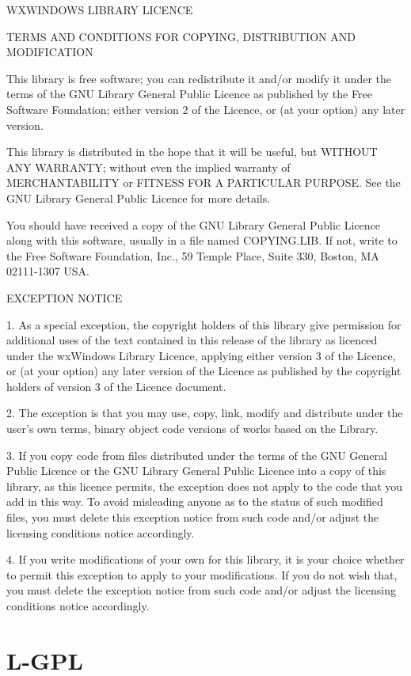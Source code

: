 \documentclass[twoside]{tceusermanual}
\begin{document}
WXWINDOWS LIBRARY LICENCE

TERMS AND CONDITIONS FOR COPYING, DISTRIBUTION AND MODIFICATION

This library is free software; you can redistribute it and/or modify it
under the terms of the GNU Library General Public Licence as published by
the Free Software Foundation; either version 2 of the Licence, or (at
your option) any later version.

This library is distributed in the hope that it will be useful, but
WITHOUT ANY WARRANTY; without even the implied warranty of
MERCHANTABILITY or FITNESS FOR A PARTICULAR PURPOSE. See the GNU Library
General Public Licence for more details.

You should have received a copy of the GNU Library General Public Licence
along with this software, usually in a file named COPYING.LIB. If not,
write to the Free Software Foundation, Inc., 59 Temple Place, Suite 330,
Boston, MA 02111-1307 USA.

EXCEPTION NOTICE

1. As a special exception, the copyright holders of this library give
permission for additional uses of the text contained in this release of
the library as licenced under the wxWindows Library Licence, applying
either version 3 of the Licence, or (at your option) any later version of
the Licence as published by the copyright holders of version 3 of the
Licence document.

2. The exception is that you may use, copy, link, modify and distribute
under the user's own terms, binary object code versions of works based
on the Library.

3. If you copy code from files distributed under the terms of the GNU
General Public Licence or the GNU Library General Public Licence into a
copy of this library, as this licence permits, the exception does not
apply to the code that you add in this way. To avoid misleading anyone as
to the status of such modified files, you must delete this exception
notice from such code and/or adjust the licensing conditions notice
accordingly.

4. If you write modifications of your own for this library, it is your
choice whether to permit this exception to apply to your modifications.
If you do not wish that, you must delete the exception notice from such
code and/or adjust the licensing conditions notice accordingly.

\section{L-GPL}
\end{document}
